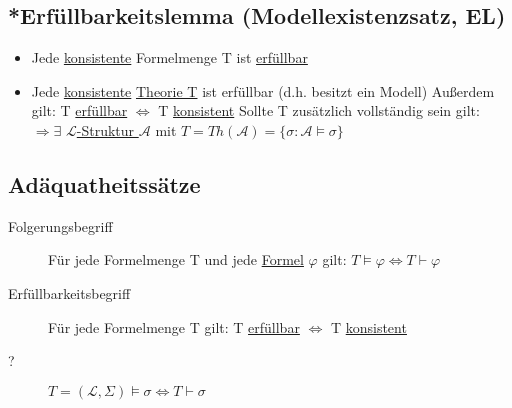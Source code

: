 \documentclass[12pt,a4paper]{article} %
\begin{document}
	\subsection{*Erfüllbarkeitslemma (Modellexistenzsatz, EL)}
	\begin{itemize}
		\item Jede \hyperref[ALKonsistent]{konsistente} Formelmenge T ist \hyperref[Erfullbar]{erfüllbar}
		\item Jede \hyperref[PLKonsistent]{konsistente} \hyperref[Theorie]{Theorie T} ist erfüllbar (d.h. besitzt ein Modell) \newline
		Außerdem gilt: T \hyperref[Erfullbar]{erfüllbar} $\Leftrightarrow$ T \hyperref[PLKonsistent]{konsistent} \newline
		Sollte T zusätzlich vollständig sein gilt: $\Rightarrow \exists$ \hyperref[Struktur]{$\mathcal{L}$-Struktur $\mathcal{A}$} mit $T = Th(\mathcal{A}) = \{\sigma : \mathcal{A} \hyperref[Erfullbar]{\vDash} \sigma\}$
	\end{itemize}
	
	\subsection{Adäquatheitssätze}
	\begin{description}
		\item[Folgerungsbegriff] Für jede Formelmenge T und jede \hyperref[Formel]{Formel} $\varphi$ gilt: $T \hyperref[Erfullbar]{\vDash} \varphi \Leftrightarrow T \hyperref[Beweisbar]{\vdash} \varphi$
		\item[Erfüllbarkeitsbegriff] Für jede Formelmenge T gilt: T \hyperref[Erfullbar]{erfüllbar} $\Leftrightarrow$ T \hyperref[ALKonsistent]{konsistent}
		\item[?] $T = (\mathcal{L}, \Sigma) \hyperref[Erfullbar]{\vDash} \sigma \Leftrightarrow T \hyperref[Beweisbar]{\vdash} \sigma$
	\end{description} 
	
\end{document}
